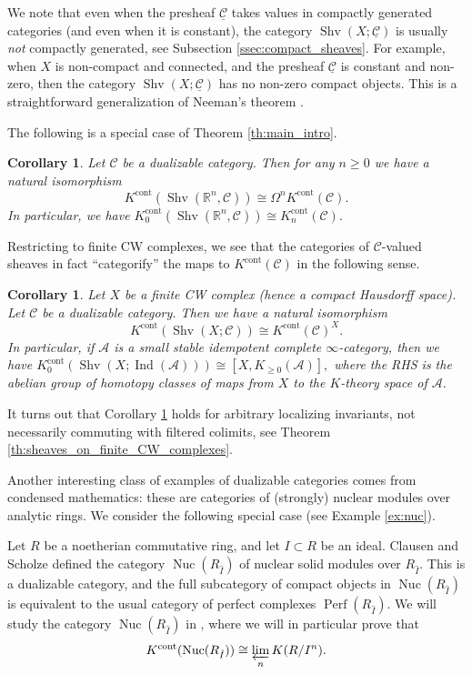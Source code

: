 \documentclass[11pt,leqno]{amsart}
\newtheorem{cor}[theo]{Corollary}
\numberwithin{equation}{section}
\def\R{\mathbb{R}}
\newcommand{\prolim}[1][]{\mathop{\varprojlim}\limits_{#1}}
\newcommand{\Nuc}{\operatorname{Nuc}}
\newcommand{\cont}{\operatorname{cont}}
\newcommand{\cA}{{\mathcal A}}
\newcommand{\cC}{{\mathcal C}}
\newcommand{\un}{\underline}
\newcommand{\Perf}{\operatorname{Perf}}
\newcommand{\Shv}{\operatorname{Shv}}
\newcommand{\Ind}{\operatorname{Ind}}
\begin{document}
We note that even when the presheaf $\un{\cC}$ takes values in compactly generated categories (and even when it is constant), the category $\Shv(X;\un{\cC})$ is usually {\it not} compactly generated, see Subsection \ref{ssec:compact_sheaves}. For example, when $X$ is non-compact and connected, and the presheaf $\un{\cC}$ is constant and non-zero, then the category $\Shv(X;\un{\cC})$ has no non-zero compact objects. This is a straightforward generalization of Neeman's theorem \cite{Nee01b}.

The following is a special case of Theorem \ref{th:main_intro}.

\begin{cor}Let $\cC$ be a dualizable category. Then for any $n\geq 0$ we have a natural isomorphism
$$K^{\cont}(\Shv(\R^n,\cC))\cong\Omega^n K^{\cont}(\cC).$$ In particular, we have $K_0^{\cont}(\Shv(\R^n,\cC))\cong K_n^{\cont}(\cC).$\end{cor}

Restricting to finite CW complexes, we see that the categories of $\cC$-valued sheaves in fact ``categorify'' the maps to $K^{\cont}(\cC)$ in the following sense.

\begin{cor}\label{cor:sheaves_on_finite_CW_complexes_intro} Let $X$ be a finite CW complex (hence a compact Hausdorff space). Let $\cC$ be a dualizable category. Then we have a natural isomorphism $$K^{\cont}(\Shv(X;\cC))\cong K^{\cont}(\cC)^X.$$ In particular, if $\cA$ is a small stable idempotent complete $\infty$-category, then we have $K_0^{\cont}(\Shv(X;\Ind(\cA)))\cong [X,K_{\geq 0}(\cA)],$ where the RHS is the abelian group of homotopy classes of maps from $X$ to the $K$-theory space of $\cA.$\end{cor}

It turns out that Corollary \ref{cor:sheaves_on_finite_CW_complexes_intro} holds for arbitrary localizing invariants, not necessarily commuting with filtered colimits, see Theorem \ref{th:sheaves_on_finite_CW_complexes}.

Another interesting class of examples of dualizable categories comes from condensed mathematics: these are categories of (strongly) nuclear modules over analytic rings. We consider the following special case (see Example \ref{ex:nuc}).

Let $R$ be a noetherian commutative ring, and let $I\subset R$ be an ideal. Clausen and Scholze \cite{CS} defined the category $\Nuc(R_{\hat{I}})$ of nuclear solid modules over $R_{\hat{I}}.$ This is a dualizable category, and the full subcategory of compact objects in $\Nuc(R_{\hat{I}})$ is equivalent to the usual category of perfect complexes $\Perf(R_{\hat{I}}).$ We will study the category $\Nuc(R_{\hat{I}})$ in \cite{E1}, where we will in particular prove that
$$K^{\cont}(\Nuc(R_{\hat{I}}))\cong\prolim[n]K(R/I^n).$$
\end{document}

